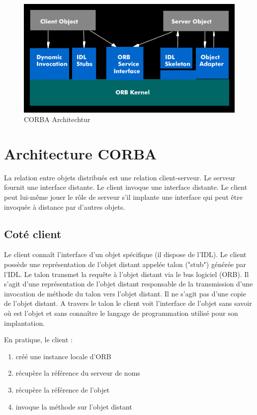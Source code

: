     \begin{figure}[h]
        \centering
        \includegraphics[scale= 0.77]{archiCorba/CORBA-Architektur.png}
        \caption{CORBA Architechtur}
    \end{figure}

    \section{Architecture CORBA}

        La relation entre objets distribués est une relation client-serveur. Le serveur fournit une interface distante. Le client invoque une interface distante. Le client peut lui-même jouer le rôle de serveur s'il implante une interface qui peut être invoquée à distance par d'autres objets. 
        \subsection*{Coté client}
        Le client connaît l'interface d'un objet spécifique (il dispose de l'IDL). Le client possède une représentation de l'objet distant appelée talon ("stub") générée par l'IDL. Le talon transmet la requête à l'objet distant via le bus logiciel (ORB). Il s'agit d'une représentation de l'objet distant responsable de la transmission d'une invocation de méthode du talon vers l'objet distant. Il ne s'agit pas d'une copie de l'objet distant.
            A travers le talon le client voit l'interface de l'objet sans savoir où est l'objet et sans connaître le langage de programmation utilisé pour son implantation.
            
            En pratique, le client :
            \begin{enumerate}
                \item créé une instance locale d'ORB
                \item récupère la référence du serveur de noms
                \item récupère la référence de l'objet
                \item invoque la méthode sur l'objet distant
            \end{enumerate}
